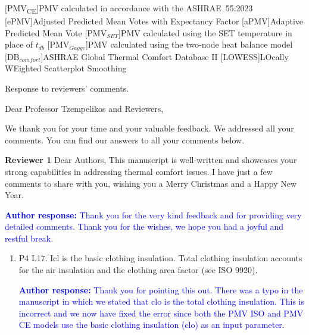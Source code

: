 \documentclass[a4paper, 10pt]{letter}
\newcommand{\response}[1]{\textcolor{blue}{\textbf{Author response:} #1}}
\begin{document}
    [PMV\textsubscript{CE}]{PMV calculated in accordance with the ASHRAE~55:2023}
    [ePMV]{Adjusted Predicted Mean Votes with Expectancy Factor}
    [aPMV]{Adaptive Predicted Mean Vote}
    [PMV$_{SET}$]{PMV calculated using the SET temperature in place of $t_{db}$}
    [PMV$_{Gagge}$]{PMV calculated using the two-node heat balance model}
    [DB$_{comfort}$]{ASHRAE Global Thermal Comfort Database II}
    [LOWESS]{LOcally WEighted Scatterplot Smoothing}

    \renewcommand{\baselinestretch}{1}\normalsize

    \begin{letter}
    {
        Response to reviewers' comments.
    }

        \opening{Dear Professor Tzempelikos and Reviewers,}


        We thank you for your time and your valuable feedback. 
        We addressed all your comments.
        You can find our answers to all your comments below.

        \textbf{Reviewer 1}
        Dear Authors,
        This manuscript is well-written and showcases your strong capabilities in addressing thermal comfort issues.
        I have just a few comments to share with you, wishing you a Merry Christmas and a Happy New Year.

        \response{
            Thank you for the very kind feedback and for providing very detailed comments.
            Thank you for the wishes, we hope you had a joyful and restful break.
        }

        \begin{enumerate}

            \item P4 L17.
            Icl is the basic clothing insulation.
            Total clothing insulation accounts for the air insulation and the clothing area factor (see ISO 9920).

            \response{
                Thank you for pointing this out.
                There was a typo in the manuscript in which we stated that \ac{clo} is the total clothing insulation.
                This is incorrect and we now have fixed the error since both the PMV ISO and PMV CE models use the basic clothing insulation (\ac{clo}) as an input parameter.
            }


\end{enumerate}
\end{letter}
\end{document}
